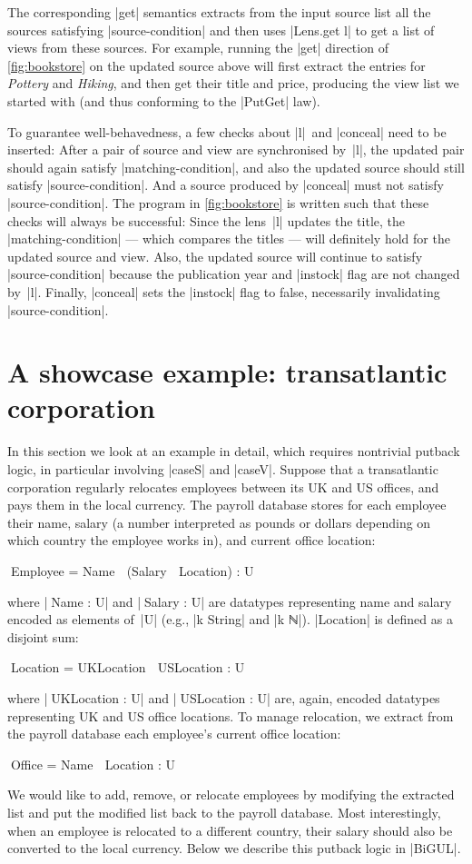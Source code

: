 \documentclass{sigplanconf}
\begin{document}
The corresponding |get| semantics extracts from the input source list all the sources satisfying |source-condition| and then uses |Lens.get l| to get a list of views from these sources.
For example, running the |get| direction of \autoref{fig:bookstore} on the updated source above will first extract the entries for \textsl{Pottery} and \textsl{Hiking}, and then get their title and price, producing the view list we started with (and thus conforming to the |PutGet| law).

To guarantee well-behavedness, a few checks about |l|~and |conceal| need to be inserted:
After a pair of source and view are synchronised by~|l|, the updated pair should again satisfy |matching-condition|, and also the updated source should still satisfy |source-condition|.
And a source produced by |conceal| must not satisfy |source-condition|.
The program in \autoref{fig:bookstore} is written such that these checks will always be successful:
Since the lens~|l| updates the title, the |matching-condition| --- which compares the titles --- will definitely hold for the updated source and view.
Also, the updated source will continue to satisfy |source-condition| because the publication year and |instock| flag are not changed by~|l|.
Finally, |conceal| sets the |instock| flag to false, necessarily invalidating |source-condition|.

\section{A showcase example: transatlantic corporation}
\label{sec:transatlantic-corporation}

In this section we look at an example in detail, which requires nontrivial putback logic, in particular involving |caseS| and |caseV|.
Suppose that a transatlantic corporation regularly relocates employees between its UK and US offices, and pays them in the local currency.
The payroll database stores for each employee their name, salary (a number interpreted as pounds or dollars depending on which country the employee works in), and current office location:
\begin{code}
^^^Employee = Name ⊗ (Salary ⊗ Location) : U
\end{code}
where |^^^Name : U| and |^^^Salary : U| are datatypes representing name and salary encoded as elements of~|U| (e.g., |k String| and |k ℕ|).
|Location| is defined as a disjoint sum:
\begin{code}
^^^Location = UKLocation ⊕ USLocation : U
\end{code}
where |^^^UKLocation : U| and |^^^USLocation : U| are, again, encoded datatypes representing UK and US office locations.
To manage relocation, we extract from the payroll database each employee's current office location:
\begin{code}
^^^Office = Name ⊗ Location : U
\end{code}
We would like to add, remove, or relocate employees by modifying the extracted list and put the modified list back to the payroll database.
Most interestingly, when an employee is relocated to a different country, their salary should also be converted to the local currency.
Below we describe this putback logic in |BiGUL|.
\end{document}
